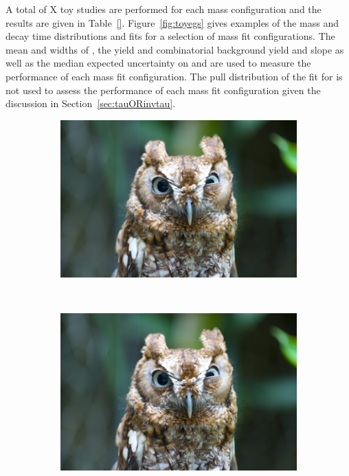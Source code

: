{A total of X toy studies are performed for each mass configuration and the results are given in Table~\ref{}. Figure~\ref{fig:toyegs} gives examples of the mass and decay time distributions and \ml fits for a selection of mass fit configurations. The mean and widths of \Gmumu, the \bsmumu yield and combinatorial background yield and slope as well as the median expected uncertainty on \tmumu and \Gmumu are used to measure the performance of each mass fit configuration. The pull distribution of the fit for \tmumu is not used to assess the performance of each mass fit configuration given the discussion in Section~\ref{sec:tauORinvtau}.

\begin{figure}[htbp]
    \centering
   \begin{subfigure}[b]{0.48\textwidth}
        \includegraphics[width= \textwidth]{./Figs/placeholder.jpeg}
    \end{subfigure}
   ~ %
    \begin{subfigure}[b]{0.48\textwidth}
       \includegraphics[width=\textwidth]{./Figs/placeholder.jpeg}

\end{subfigure}
\end{figure}}
